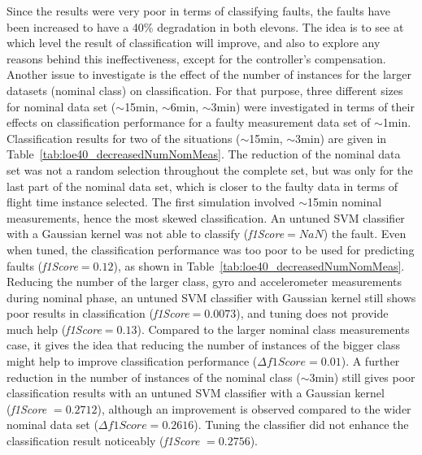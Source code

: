 Since the results were very poor in terms of classifying faults, the faults have been increased to have a 40\% degradation in both elevons. 
The idea is to see at which level the result of classification will improve, and also to explore any reasons behind this ineffectiveness, except for the controller's compensation. 
Another issue to investigate is the effect of the number of instances for the larger datasets (nominal class) on classification. 
For that purpose, three different sizes for nominal data set ($\sim$15min, $\sim$6min, $\sim$3min) were investigated in terms of their effects on classification performance for a faulty measurement data set of $\sim$1min. 
Classification results for two of the situations ($\sim$15min, $\sim$3min) are given in Table~\ref{tab:loe40_decreasedNumNomMeas}. 
The reduction of the nominal data set was not a random selection throughout the complete set, but was only for the last part of the nominal data set, which is closer to the faulty data in terms of flight time instance selected. 
The first simulation involved $\sim$15min nominal measurements, hence the most skewed classification. 
An untuned SVM classifier with a Gaussian kernel was not able to classify (\emph{f1Score}$ = NaN$) the fault. 
Even when tuned, the classification performance was too poor to be used for predicting faults (\emph{f1Score}$ = 0.12$), as shown in Table~\ref{tab:loe40_decreasedNumNomMeas}. 
Reducing the number of the larger class, gyro and accelerometer measurements during nominal phase, an untuned SVM classifier with Gaussian kernel still shows poor results in classification (\emph{f1Score}$ = 0.0073$), and tuning does not provide much help (\emph{f1Score}$ = 0.13$). 
Compared to the larger nominal class measurements case, it gives the idea that reducing the number of instances of the bigger class might help to improve classification performance ($\Delta f1Score = 0.01$).
A further reduction in the number of instances of the nominal class ($\sim$3min) still gives poor classification results with an untuned SVM classifier with a Gaussian kernel (\emph{f1Score} $= 0.2712$), although an improvement is observed compared to the wider nominal data set ($\Delta f1Score = 0.2616$). 
Tuning the classifier did not enhance the classification result noticeably (\emph{f1Score} $= 0.2756$).


